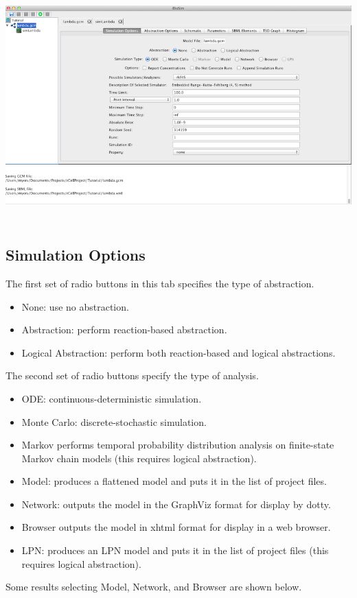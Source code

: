 \documentclass[titlepage,11pt]{article}
\begin{document}
\begin{center}
\includegraphics[height=90mm]{screenshots/analysisView}
\end{center}

\subsection{\label{simOptions}Simulation Options}

\noindent
The first set of radio buttons in this tab specifies the type of abstraction. 
\begin{itemize}
\item None: use no abstraction.
\item Abstraction: perform reaction-based abstraction.
\item Logical Abstraction: perform both reaction-based and logical abstractions.
\end{itemize}

The second set of radio buttons specify the type of analysis.  
\begin{itemize}
\item ODE: continuous-deterministic simulation.
\item Monte Carlo: discrete-stochastic simulation.
\item Markov performs temporal probability distribution analysis on finite-state Markov chain models (this requires logical abstraction).
\item Model: produces a flattened model and puts it in the list of project files.
\item Network: outputs the model in the GraphViz format for display by dotty.
\item Browser outputs the model in xhtml format for display in a web browser.
\item LPN: produces an LPN model and puts it in the list of project files (this requires logical abstraction).  
\end{itemize}
Some results selecting Model, Network, and Browser are shown below.
\end{document}
